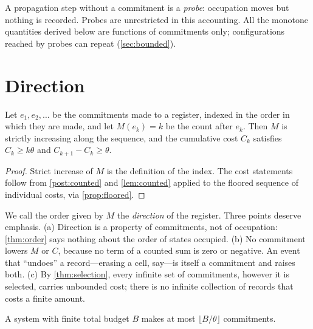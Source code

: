 \documentclass[10pt,twocolumn,a4paper]{article}
\begin{document}
\begin{remark}
\label{rem:probe}
A propagation step without a commitment is a \emph{probe}: occupation moves
but nothing is recorded. Probes are unrestricted in this accounting. All the
monotone quantities derived below are functions of commitments only;
configurations reached by probes can repeat (\cref{sec:bounded}).
\end{remark}

\section{Direction}
\label{sec:direction}

\begin{theorem}
\label{thm:order}
Let $e_1,e_2,\dots$ be the commitments made to a register, indexed in the
order in which they are made, and let $M(e_k)=k$ be the count after $e_k$.
Then $M$ is strictly increasing along the sequence, and the cumulative cost
$C_k$ satisfies $C_k\ge k\theta$ and $C_{k+1}-C_k\ge\theta$.
\end{theorem}

\begin{proof}
Strict increase of $M$ is the definition of the index. The cost statements
follow from \cref{post:counted} and \cref{lem:counted} applied to the
floored sequence of individual costs, via \cref{prop:floored}.
\end{proof}

We call the order given by $M$ the \emph{direction} of the register. Three
points deserve emphasis. (a) Direction is a property of commitments, not of
occupation: \cref{thm:order} says nothing about the order of states
occupied. (b) No commitment lowers $M$ or $C$, because no term of a counted
sum is zero or negative. An event that ``undoes'' a record---erasing a cell,
say---is itself a commitment and raises both. (c) By \cref{thm:selection},
every infinite set of commitments, however it is selected, carries unbounded
cost; there is no infinite collection of records that costs a finite amount.

\begin{corollary}
\label{cor:no-zeno-records}
A system with finite total budget $B$ makes at most $\lfloor B/\theta\rfloor$
commitments.
\end{corollary}
\end{document}
